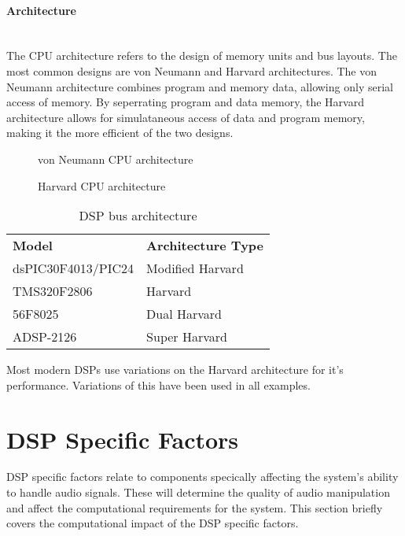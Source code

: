 \documentclass[titlepage]{scrartcl}
\begin{document}
    \paragraph{Architecture}~\\
    The CPU architecture refers to the design of memory units and bus layouts.
    The most common designs are von Neumann and Harvard architectures. The von
    Neumann architecture combines program and memory data, allowing only serial
    access of memory. By seperrating program and data memory, the Harvard
    architecture allows for simulataneous access of data and program memory,
    making it the more efficient of the two designs.~\parencite[p.320-321]{raf2014fdlm}
    \begin{figure}[H]
        \caption{von Neumann CPU architecture}
    \end{figure}
    \begin{figure}[H]
        \caption{Harvard CPU architecture}
    \end{figure}

    \begin{table}[H]
    \centering
    \caption{DSP bus architecture}
    \label{my-label}
    \begin{tabular}{ll}
        \textbf{Model}              & \textbf{Architecture Type}\\
        dsPIC30F4013/PIC24 & Modified Harvard\\
        TMS320F2806        & Harvard\\
        56F8025            & Dual Harvard\\
        ADSP-2126          & Super Harvard
    \end{tabular}
    \end{table}

    Most modern DSPs use variations on the Harvard architecture for it's
    performance. Variations of this have been used in all examples.

    \section{DSP Specific Factors}
    DSP specific factors relate to components specically affecting the system's
    ability to handle audio signals. These will determine the quality of audio
    manipulation and affect the computational requirements for the system. This
    section briefly covers the computational impact of the DSP specific
    factors.
\end{document}
